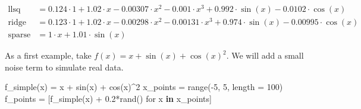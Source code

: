 \documentclass[
]{article}
\newenvironment{Shaded}{\begin{snugshade}}{\end{snugshade}}
\newcommand{\CommentTok}[1]{\textcolor[rgb]{0.37,0.37,0.37}{#1}}
\newcommand{\FloatTok}[1]{\textcolor[rgb]{0.68,0.00,0.00}{#1}}
\newcommand{\FunctionTok}[1]{\textcolor[rgb]{0.28,0.35,0.67}{#1}}
\newcommand{\KeywordTok}[1]{\textcolor[rgb]{0.00,0.23,0.31}{\textbf{#1}}}
\newcommand{\NormalTok}[1]{\textcolor[rgb]{0.00,0.23,0.31}{#1}}
\newcommand{\OperatorTok}[1]{\textcolor[rgb]{0.37,0.37,0.37}{#1}}
\newcommand{\SpecialCharTok}[1]{\textcolor[rgb]{0.37,0.37,0.37}{#1}}
\newcommand{\StringTok}[1]{\textcolor[rgb]{0.13,0.47,0.30}{#1}}
\begin{document}
\begin{Shaded}
\end{Shaded}

\begin{subequations} \label{eq:f-simple-1-sparse} \begin{align}    \mathrm{llsq} &= 0.124 \cdot 1 + 1.02 \cdot x -0.00307 \cdot x^{2} -0.001 \cdot x^{3} + 0.992 \cdot \sin\left( x \right) -0.0102 \cdot \cos\left( x \right) \\
  \mathrm{ridge} &= 0.123 \cdot 1 + 1.02 \cdot x -0.00298 \cdot x^{2} -0.00131 \cdot x^{3} + 0.974 \cdot \sin\left( x \right) -0.00995 \cdot \cos\left( x \right) \\
  \mathrm{sparse} &= 1 \cdot x + 1.01 \cdot \sin\left( x \right) \end{align} \end{subequations}

As a first example, take \(f(x) = x + \sin(x) + \cos(x)^2\). We will add
a small noise term to simulate real data.

\begin{Shaded}
\begin{Highlighting}[]
\FunctionTok{f\_simple}\NormalTok{(x) }\OperatorTok{=}\NormalTok{ x }\OperatorTok{+} \FunctionTok{sin}\NormalTok{(x) }\OperatorTok{+} \FunctionTok{cos}\NormalTok{(x)}\OperatorTok{\^{}}\FloatTok{2}
\NormalTok{x\_points }\OperatorTok{=} \FunctionTok{range}\NormalTok{(}\OperatorTok{{-}}\FloatTok{5}\NormalTok{, }\FloatTok{5}\NormalTok{, length }\OperatorTok{=} \FloatTok{100}\NormalTok{)}
\NormalTok{f\_points }\OperatorTok{=}\NormalTok{ [}\FunctionTok{f\_simple}\NormalTok{(x) }\OperatorTok{+} \FloatTok{0.2}\FunctionTok{*rand}\NormalTok{() for x }\KeywordTok{in}\NormalTok{ x\_points]}
\end{Highlighting}
\end{Shaded}
\end{document}
